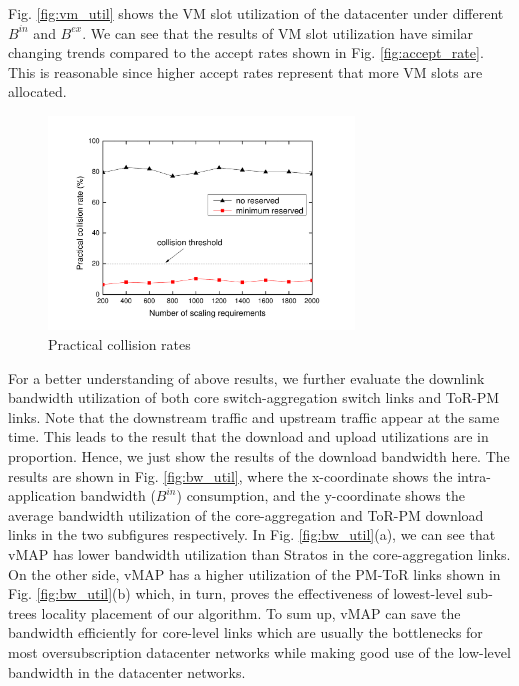 \documentclass[review]{elsarticle}
\begin{document}
Fig. \ref{fig:vm_util} shows the VM slot utilization of the datacenter under different $B^{in}$ and $B^{ex}$. We can see that the results of VM slot utilization have similar changing trends compared to the accept rates shown in Fig. \ref{fig:accept_rate}.
This is reasonable since higher accept rates represent that
more VM slots are allocated.  

\begin{figure}[h]
	\centering
	\includegraphics[width=3.2in]{fig/collision_rate_num.pdf}
	\caption{Practical collision rates}
	\label{fig:collision_rate_num}
\end{figure}

For a better understanding of above results, we further evaluate the downlink bandwidth utilization of both core switch-aggregation switch links and ToR-PM links. Note that the downstream traffic and upstream traffic appear at the same time.
This leads to the result that the download and upload utilizations are in proportion.
Hence, we just show the results of the download bandwidth here. The results are shown in Fig. \ref{fig:bw_util}, where the x-coordinate shows the
intra-application bandwidth ($B^{in}$) consumption, and the y-coordinate shows the average bandwidth utilization of the core-aggregation and ToR-PM download links in the two subfigures respectively. In Fig. \ref{fig:bw_util}(a), we can see that vMAP has lower bandwidth utilization than Stratos in the core-aggregation links. On the other side, vMAP has a higher utilization of the PM-ToR links shown in Fig. \ref{fig:bw_util}(b) which, in turn, proves the effectiveness of lowest-level sub-trees locality placement of our algorithm. To sum up, vMAP can save the bandwidth efficiently for core-level links which are usually the bottlenecks for most oversubscription datacenter networks while making good use of the low-level bandwidth 
in the datacenter networks. 
\end{document}
